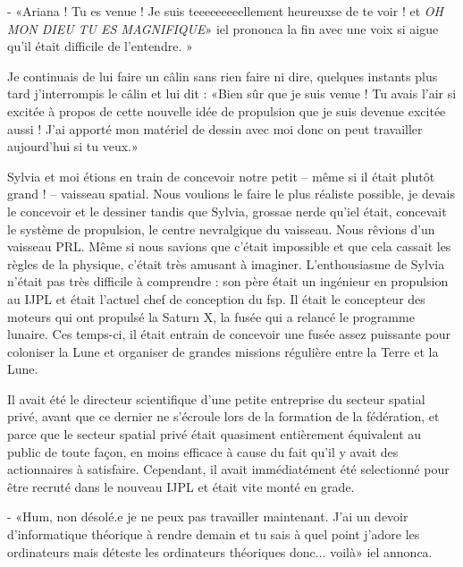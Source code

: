 \documentclass[12pt,hidelinks,a4paper]{book}
\renewcommand{\cdot}{\textperiodcentered}
\begin{document}
\bigskip

- «Ariana ! Tu es venue ! Je suis teeeeeeeeellement heureux\cdot se de
te voir ! et \textit{OH MON DIEU TU ES MAGNIFIQUE}» iel prononca
la fin avec une voix si aigue qu'il était difficile de l'entendre.
»

\bigskip

Je continuais de lui faire un câlin sans rien faire ni dire, quelques
instants plus tard j'interrompis le câlin et lui dit : «Bien sûr
que je suis venue ! Tu avais l'air si excité\cdot e à propos de cette nouvelle
idée de propulsion que je suis devenue excitée aussi ! J'ai apporté
mon matériel de dessin avec moi donc on peut travailler aujourd'hui
si tu veux.»

\bigskip

Sylvia et moi étions en train de concevoir notre petit -- même si
il était plutôt grand ! -- vaisseau spatial. Nous voulions le faire
le plus réaliste possible, je devais le concevoir et le dessiner tandis
que Sylvia, grossae nerd\cdot e qu'iel était, concevait le système de propulsion,
le centre nevralgique du vaisseau. Nous rêvions d'un vaisseau PRL.
Même si nous savions que c'était impossible et que cela cassait les
règles de la physique, c'était très amusant à imaginer. L'enthousiasme
de Sylvia n'était pas très difficile à comprendre : son père était
un ingénieur en propulsion au IJPL et était l'actuel chef de conception
du \gls{fsp}. Il était le concepteur des moteurs qui ont propulsé
la Saturn X, la fusée qui a relancé le programme lunaire. Ces temps-ci,
il était entrain de concevoir une fusée assez puissante pour coloniser
la Lune et organiser de grandes missions régulière entre la Terre
et la Lune.

\bigskip

Il avait été le directeur scientifique d'une petite entreprise du
secteur spatial privé, avant que ce dernier ne s'écroule lors de la
formation de la fédération, et parce que le secteur spatial privé
était quasiment entièrement équivalent au public de toute façon, en
moins efficace à cause du fait qu'il y avait des actionnaires à satisfaire.
Cependant, il avait immédiatément été selectionné pour être recruté
dans le nouveau IJPL et était vite monté en grade.

\bigskip

- «Hum, non désolé.e je ne peux pas travailler maintenant. J'ai
un devoir d'informatique théorique à rendre demain et tu sais à quel
point j'adore les ordinateurs mais déteste les ordinateurs théoriques
donc... voilà» iel annonca. 
\end{document}
